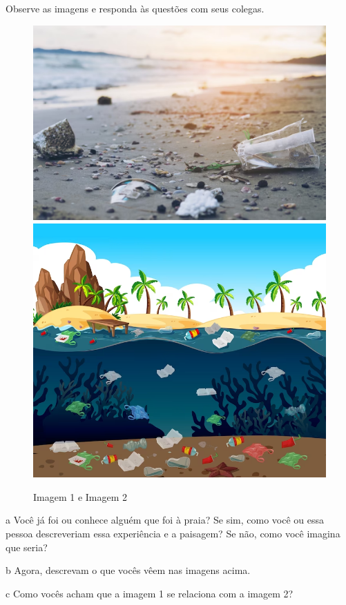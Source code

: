 Observe as imagens e responda às questões com seus colegas.

\begin{figure}[htpb!]
\includegraphics[width=.5\textwidth]{./imgs/img35.png}
\includegraphics[width=.5\textwidth]{./imgs/img36.png}
\caption{Imagem 1 e Imagem 2}
\end{figure}



\num{a} Você já foi ou conhece alguém que foi à praia? Se sim, como você ou essa
pessoa descreveriam essa experiência e a paisagem? Se não, como você
imagina que seria?


\num{b} Agora, descrevam o que vocês vêem nas imagens acima.


\num{c} Como vocês acham que a imagem 1 se relaciona com a imagem 2?

